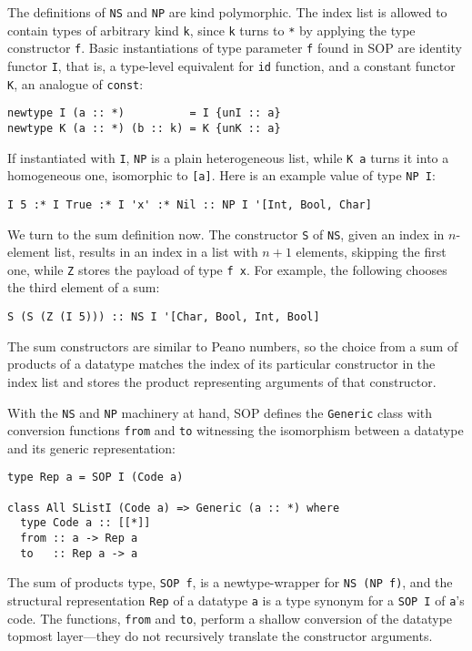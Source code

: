 \documentclass[runningheads]{llncs}
\newcommand{\K}[1]{\lstinline[style=fancy]{#1}}
\begin{document}
The definitions of \K{NS} and \K{NP} are kind polymorphic. The index list is allowed to contain types of arbitrary kind \K{k}, since \K{k} turns to \K{*} by applying the type constructor \K{f}.
Basic instantiations of type parameter \K{f} found in SOP are identity functor \K{I}, that is, a type-level equivalent for \K{id} function, and a constant functor \K{K}, an analogue of \K{const}:
\begin{lstlisting}[style=fancy]
newtype I (a :: *)          = I {unI :: a}
newtype K (a :: *) (b :: k) = K {unK :: a}
\end{lstlisting}
If instantiated with \K{I}, \K{NP} is a plain heterogeneous list, while \K{K a} turns it into a homogeneous one, isomorphic to \K{[a]}. Here is an example value of type \K{NP I}:
\begin{lstlisting}[style=fancy]
I 5 :* I True :* I 'x' :* Nil :: NP I '[Int, Bool, Char]
\end{lstlisting}

We turn to the sum definition now. The constructor \K{S} of \K{NS}, given an index in $n$-element list, results in an index in a list with $n+1$ elements, skipping the first one, while \K{Z} stores the payload of type \K{f x}. For example, the following chooses the third element of a sum:
\begin{lstlisting}[style=fancy]
S (S (Z (I 5))) :: NS I '[Char, Bool, Int, Bool]
\end{lstlisting}
The sum constructors are similar to Peano numbers, so the choice from a sum of products of a datatype matches the index of its particular constructor in the index list and stores the product representing arguments of that constructor.

With the \K{NS} and \K{NP} machinery at hand, SOP defines the \K{Generic} class with conversion functions \K{from} and \K{to} witnessing the isomorphism between a datatype and its generic representation:
\begin{lstlisting}[style=fancy]
type Rep a = SOP I (Code a)

class All SListI (Code a) => Generic (a :: *) where
  type Code a :: [[*]]
  from :: a -> Rep a
  to   :: Rep a -> a
\end{lstlisting}
The sum of products type, \K{SOP f}, is a newtype-wrapper for \K{NS (NP f)}, and the structural representation \K{Rep} of a datatype \K{a} is a type synonym for a \K{SOP I} of \K{a}'s code. The functions, \K{from} and \K{to}, perform a shallow conversion of the datatype topmost layer---they do not recursively translate the constructor arguments.
\end{document}
